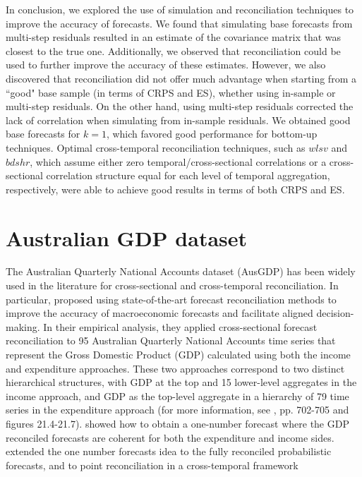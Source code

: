 \documentclass[a4paper,11pt]{article}
\theoremstyle{definition}
\begin{document}
In conclusion, we explored the use of simulation and reconciliation techniques to improve the accuracy of forecasts. We found that simulating base forecasts from multi-step residuals resulted in an estimate of the covariance matrix that was closest to the true one. Additionally, we observed that reconciliation could be used to further improve the accuracy of these estimates. However, we also discovered that reconciliation did not offer much advantage when starting from a “good" base sample (in terms of CRPS and ES), whether using in-sample or multi-step residuals. On the other hand, using multi-step residuals corrected the lack of correlation when simulating from in-sample residuals. We obtained good base forecasts for $k=1$, which favored good performance for bottom-up techniques. Optimal cross-temporal reconciliation techniques, such as $wlsv$ and $bdshr$, which assume either zero temporal/cross-sectional correlations or a cross-sectional correlation structure equal for each level of temporal aggregation, respectively, were able to achieve good results in terms of both CRPS and ES.

\section{Australian GDP dataset}\label{sec:ausgdp}

The Australian Quarterly National Accounts dataset (AusGDP) has been widely used in the literature for cross-sectional and cross-temporal reconciliation. In particular, \cite{athanasopoulos2020} proposed using state-of-the-art forecast reconciliation methods to improve the accuracy of macroeconomic forecasts and facilitate aligned decision-making. In their empirical analysis, they applied cross-sectional forecast reconciliation to 95 Australian Quarterly National Accounts time series that represent the Gross Domestic Product (GDP) calculated using both the income and expenditure approaches. These two approaches correspond to two distinct hierarchical structures, with GDP at the top and 15 lower-level aggregates in the income approach, and GDP as the top-level aggregate in a hierarchy of 79 time series in the expenditure approach (for more information, see \citealp{athanasopoulos2020}, pp. 702-705 and figures 21.4-21.7).
\cite{bisaglia2020} showed how to obtain a one-number forecast where the GDP reconciled forecasts are coherent for both the expenditure and income sides.
 \cite{giro2022, difonzo2022c} extended the one number forecasts idea to the fully reconciled probabilistic forecasts, and \cite{difonzo2023} to point reconciliation in a cross-temporal framework
\end{document}
